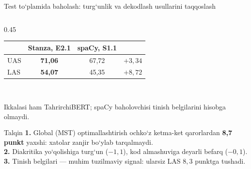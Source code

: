\documentclass[aspectratio=169,11pt]{beamer}
\gdef\yangiliknum{}
\newcommand{\yangilik}[1]{\gdef\yangiliknum{#1}}
\newcommand{\manba}[1]{{\tiny\color{black!55}#1\par}}
\begin{document}
\begin{frame}{Test to‘plamida baholash: turg‘unlik va dekodlash usullarini taqqoslash}
\begin{columns}[T,onlytextwidth]
\begin{column}{0.45\textwidth}
\begin{tabular}{@{}lccc@{}}
    & {\tiny Stanza, E2.1} & {\tiny spaCy, S1.1} & \\
    \midrule
    UAS & \textbf{71,06} & 67,72 & $+3{,}34$\\
    LAS & \textbf{54,07} & 45,35 & $+8{,}72$\\
    \bottomrule
  \end{tabular}\\[2pt]
  \manba{Ikkalasi ham TahrirchiBERT; spaCy baholovchisi tinish belgilarini hisobga olmaydi.}\vspace{6pt}
  \begin{block}{Talqin}
    \scriptsize \textbf{1.} Global (MST) optimallashtirish ochko‘z ketma-ket qarorlardan \textbf{8,7 punkt} yaxshi: xatolar zanjir bo‘ylab tarqalmaydi.\\
    \textbf{2.} Diakritika yo‘qolishiga turg‘un ($-1{,}1$), kod almashuviga deyarli befarq ($-0{,}1$).\\
    \textbf{3.} Tinish belgilari --- muhim tuzilmaviy signal: ularsiz LAS $8{,}3$ punktga tushadi.
  \end{block}
\end{column}
\end{columns}
\yangilik{3, 4}
\end{frame}

\end{document}
